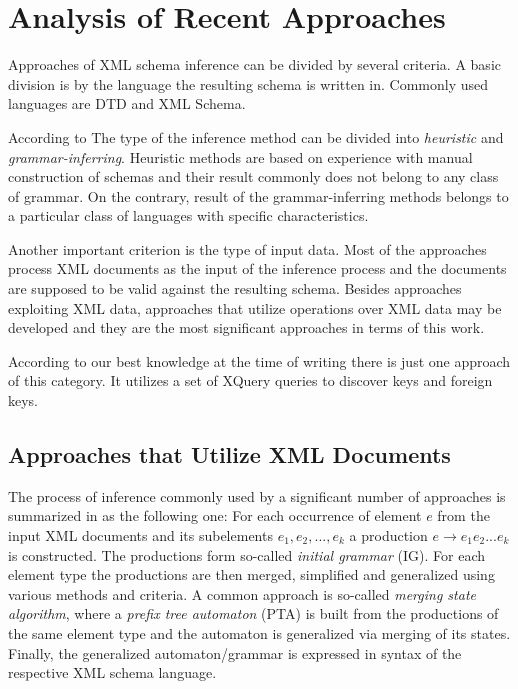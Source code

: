 \chapter{Analysis of Recent Approaches}
Approaches of XML schema inference can be divided by several criteria. A basic division is by the language the resulting schema is written in. Commonly used languages are DTD and XML Schema.

According to \cite{Mlynkova:2008:AAX:1494650.1495496} The type of the inference method can be divided into \emph{heuristic} and \emph{grammar-inferring}. Heuristic methods are based on experience with manual construction of schemas and their result commonly does not belong to any class of grammar. On the contrary, result of the grammar-inferring methods belongs to a particular class of languages with specific characteristics.

Another important criterion is the type of input data. Most of the approaches process XML documents as the input of the inference process and the documents are supposed to be valid against the resulting schema. Besides approaches exploiting XML data, approaches that utilize operations over XML data may be developed and they are the most significant approaches in terms of this work.

According to our best knowledge at the time of writing there is just one approach of this category. It utilizes a set of XQuery queries to discover keys and foreign keys.

\section{Approaches that Utilize XML Documents}
The process of inference commonly used by a significant number of approaches is summarized in \cite{Mlynkova:2008:AAX:1494650.1495496} as the following one: For each occurrence of element $e$ from the input XML documents and its subelements $e_1, e_2, ..., e_k$ a production $e \rightarrow e_1 e_2 ... e_k$ is constructed. The productions form so-called \emph{initial grammar} (IG). For each element type the productions are then merged, simplified and generalized using various methods and criteria. A common approach is so-called \emph{merging state algorithm}, where a \emph{prefix tree automaton} (PTA) is built from the productions of the same element type and the automaton is generalized via merging of its states. Finally, the generalized automaton/grammar is expressed in syntax of the respective XML schema language.


